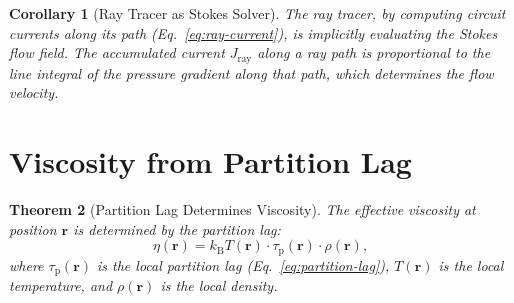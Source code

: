 \documentclass[11pt,twocolumn,a4paper]{article}
\newtheorem{theorem}{Theorem}[section]
\newtheorem{corollary}[theorem]{Corollary}
\newcommand{\kb}{k_{\mathrm{B}}}
\newcommand{\taup}{\tau_{\mathrm{p}}}
\newcommand{\Jray}{J_{\mathrm{ray}}}
\begin{document}
\begin{corollary}[Ray Tracer as Stokes Solver]
\label{cor:ray-stokes}
The ray tracer, by computing circuit currents along its path
(Eq.~\eqref{eq:ray-current}), is implicitly evaluating the
Stokes flow field. The accumulated current $\Jray$ along a ray
path is proportional to the line integral of the pressure gradient
along that path, which determines the flow velocity.
\end{corollary}


\section{Viscosity from Partition Lag}
\label{sec:viscosity}

\begin{theorem}[Partition Lag Determines Viscosity]
\label{thm:viscosity}
The effective viscosity at position $\mathbf{r}$ is determined by the
partition lag:
\begin{equation}
\eta(\mathbf{r}) = \kb T(\mathbf{r}) \cdot \taup(\mathbf{r}) \cdot
  \rho(\mathbf{r}),
\label{eq:viscosity}
\end{equation}
where $\taup(\mathbf{r})$ is the local partition lag
(Eq.~\eqref{eq:partition-lag}), $T(\mathbf{r})$ is the local
temperature, and $\rho(\mathbf{r})$ is the local density.
\end{theorem}
\end{document}
